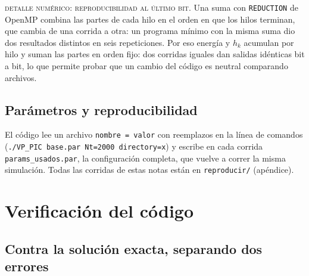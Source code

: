 \documentclass[11pt,a4paper]{article}
\begin{document}
\begin{aviso}
\textsc{detalle numérico: reproducibilidad al último bit.} Una suma con
\texttt{REDUCTION} de OpenMP combina las partes de cada hilo en el orden en que los hilos
terminan, que cambia de una corrida a otra: un programa mínimo con la misma suma dio dos
resultados distintos en seis repeticiones. Por eso energía y $h_k$ acumulan por hilo y
suman las partes en orden fijo: dos corridas iguales dan salidas idénticas bit a bit, lo
que permite probar que un cambio del código es neutral comparando archivos.
\end{aviso}

\subsection{Parámetros y reproducibilidad}

El código lee un archivo \texttt{nombre = valor} con reemplazos en la línea de comandos
(\texttt{./VP\_PIC base.par Nt=2000 directory=x}) y escribe en cada corrida
\texttt{params\_usados.par}, la configuración completa, que vuelve a correr la misma
simulación. Todas las corridas de estas notas están en \texttt{reproducir/} (apéndice).

\section{Verificación del código}
\label{sec:verificacion}

\subsection{Contra la solución exacta, separando dos errores}
\label{sec:exacta}
\end{document}
